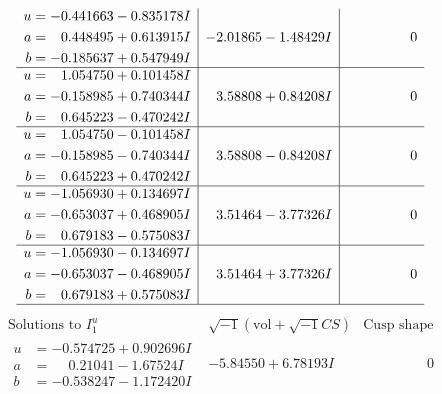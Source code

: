 \documentclass[1p]{elsarticle_modified}
\theoremstyle{definition}
\newcommand{\I}{\sqrt{-1}}
\begin{document}
$$\begin{array}{c|c|c}
\begin{aligned}
u &= -0.441663 - 0.835178 I \\
a &= \phantom{-}0.448495 + 0.613915 I \\
b &= -0.185637 + 0.547949 I\end{aligned}
 & -2.01865 - 1.48429 I & \phantom{-0.000000 } 0 \\ \hline\begin{aligned}
u &= \phantom{-}1.054750 + 0.101458 I \\
a &= -0.158985 + 0.740344 I \\
b &= \phantom{-}0.645223 - 0.470242 I\end{aligned}
 & \phantom{-}3.58808 + 0.84208 I & \phantom{-0.000000 } 0 \\ \hline\begin{aligned}
u &= \phantom{-}1.054750 - 0.101458 I \\
a &= -0.158985 - 0.740344 I \\
b &= \phantom{-}0.645223 + 0.470242 I\end{aligned}
 & \phantom{-}3.58808 - 0.84208 I & \phantom{-0.000000 } 0 \\ \hline\begin{aligned}
u &= -1.056930 + 0.134697 I \\
a &= -0.653037 + 0.468905 I \\
b &= \phantom{-}0.679183 - 0.575083 I\end{aligned}
 & \phantom{-}3.51464 - 3.77326 I & \phantom{-0.000000 } 0 \\ \hline\begin{aligned}
u &= -1.056930 - 0.134697 I \\
a &= -0.653037 - 0.468905 I \\
b &= \phantom{-}0.679183 + 0.575083 I\end{aligned}
 & \phantom{-}3.51464 + 3.77326 I & \phantom{-0.000000 } 0\\
 \hline 
 \end{array}$$\newpage$$\begin{array}{c|c|c}  
\text{Solutions to }I^u_{1}& \I (\text{vol} + \sqrt{-1}CS) & \text{Cusp shape}\\
 \hline 
\begin{aligned}
u &= -0.574725 + 0.902696 I \\
a &= \phantom{-}0.21041 - 1.67524 I \\
b &= -0.538247 - 1.172420 I\end{aligned}
 & -5.84550 + 6.78193 I & \phantom{-0.000000 } 0 \\ \hline\begin{aligned}

\end{aligned}
\end{array}$$
\end{document}
